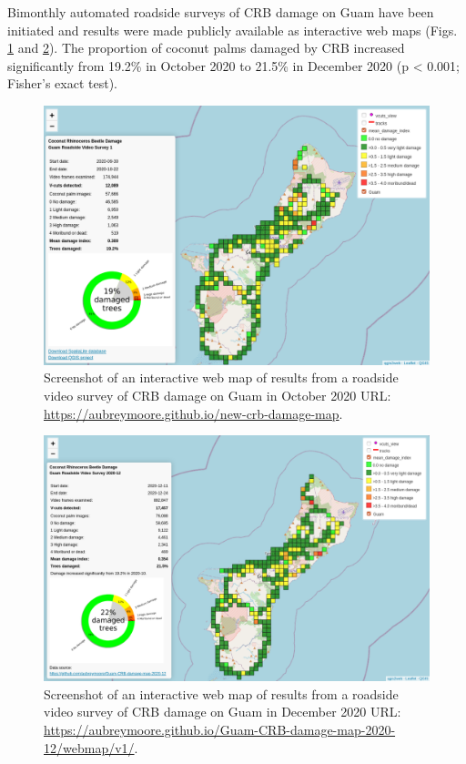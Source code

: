 \documentclass[12pt,letterpaper,english,bibliography=totocnumbered,abstract=on]{scrartcl}
\begin{document}
Bimonthly automated roadside surveys of CRB damage on Guam have been initiated and results were made publicly available as interactive web maps (Figs. \ref{fig:webmap1} and \ref{fig:webmap2}). The proportion of coconut palms damaged by CRB increased significantly from 19.2\% in October 2020 to 21.5\% in December 2020 (p < 0.001; Fisher's exact test). 

\begin{figure}[p]
	\centering
	\includegraphics[width=0.75\linewidth]{images/crb-webmap-2020-10.png}
	\caption{Screenshot of an interactive web map of results from a roadside video survey of CRB damage on Guam in October 2020 URL: \url{https://aubreymoore.github.io/new-crb-damage-map}.}
	\label{fig:webmap1}
\end{figure}

\begin{figure}[p]
	\centering
	\includegraphics[width=0.75\linewidth]{images/crb-webmap-2020-12.png}
	\caption{Screenshot of an interactive web map of results from a roadside video survey of CRB damage on Guam in December 2020 URL: \url{https://aubreymoore.github.io/Guam-CRB-damage-map-2020-12/webmap/v1/}.}
	\label{fig:webmap2}
\end{figure}
\end{document}
